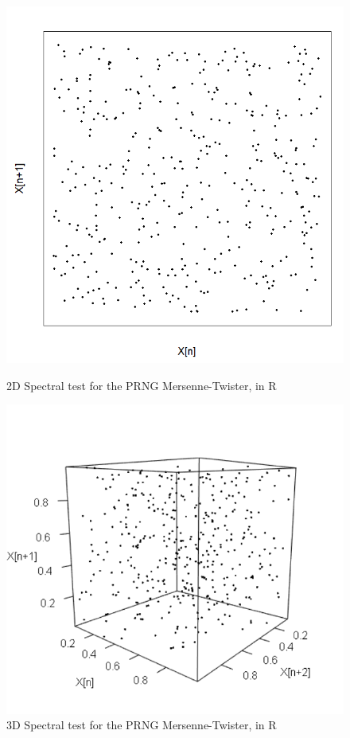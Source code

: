 \begin{figure}
	\centering
	\begin{minipage}{0.45\textwidth}
		\centering
		\includegraphics[width=\linewidth]{billder/ms_spec_2d.png}
		\caption{2D Spectral test for the PRNG Mersenne-Twister, in R}
		\label{fig:msspec2d}
	\end{minipage}\hfill
	\begin{minipage}{0.45\textwidth}
		\centering
		\includegraphics[width=\linewidth]{billder/ms_spec_3d.png}
		\caption{3D Spectral test for the PRNG Mersenne-Twister, in R}
		\label{fig:msspec3d}
	\end{minipage}
\end{figure}